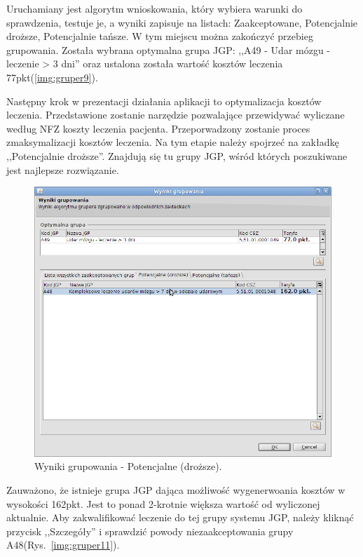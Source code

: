 Uruchamiany jest algorytm wnioskowania, który wybiera warunki do sprawdzenia, testuje je, a wyniki zapisuje na listach: Zaakceptowane, Potencjalnie droższe, Potencjalnie tańsze. W tym miejscu można zakończyć przebieg grupowania. Została wybrana optymalna grupa JGP: ,,A49 - Udar mózgu - leczenie > 3 dni'' oraz ustalona została wartość kosztów leczenia 77pkt(\ref{img:gruper9}).

Następny krok w prezentacji działania aplikacji to optymalizacja kosztów leczenia. Przedstawione zostanie narzędzie pozwalające przewidywać wyliczane według NFZ koszty leczenia pacjenta. Przeporwadzony zostanie proces zmaksymalizacji kosztów leczenia. Na tym etapie należy spojrzeć na zakładkę ,,Potencjalnie droższe''. Znajdują się tu grupy JGP, wśród których poszukiwane jest najlepsze rozwiązanie.

\begin{figure}%
\centering
\includegraphics[scale=0.4]{images/gruper10}
\caption[Widok grupera]{Wyniki grupowania - Potencjalne (droższe).}
\label{img:gruper10}
\end{figure}

Zauważono, że istnieje grupa JGP dająca możliwość wygenerwoania kosztów w wysokości 162pkt. Jest to ponad 2-krotnie większa wartość od wyliczonej aktualnie. Aby zakwalifikować leczenie do tej grupy systemu JGP, należy kliknąć przycisk ,,Szczegóły'' i sprawdzić powody niezaakceptowania grupy A48(Rys.~\ref{img:gruper11}).

